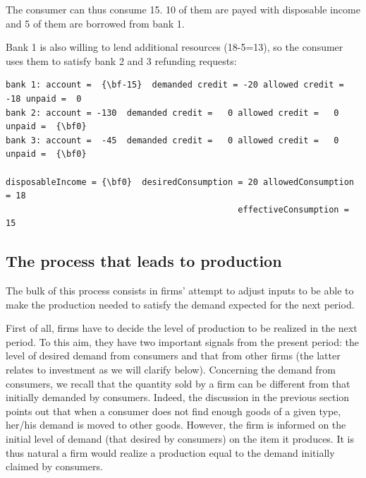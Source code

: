 \documentclass{book}
\begin{document}
The consumer can thus consume 15. 10 of them are payed with disposable income and 5 of them are borrowed from bank 1. 

Bank 1 is also willing to lend additional resources (18-5=13), so the consumer uses them to satisfy bank 2 and 3 refunding requests:

\begin{Verbatim}[commandchars=\\\{\}]
bank 1: account =  {\bf-15}  demanded credit = -20 allowed credit = -18 unpaid =  0
bank 2: account = -130  demanded credit =   0 allowed credit =   0 unpaid =  {\bf0}
bank 3: account =  -45  demanded credit =   0 allowed credit =   0 unpaid =  {\bf0}

disposableIncome = {\bf0}  desiredConsumption = 20 allowedConsumption = 18 
                                              effectiveConsumption = 15
\end{Verbatim}




\subsection{The process that leads to production}

The bulk of this process consists in firms' attempt to adjust inputs to be able to make the production needed to satisfy the demand expected for the next period.

First of all, firms have to decide the level of production to be realized in the next period. To this aim, they have two important signals from the present period: the level of desired demand from consumers and that from other firms (the latter relates to investment as we will clarify below).
Concerning the demand from consumers, we recall that the quantity sold by a firm can be different from that initially demanded by consumers. Indeed, the discussion in the previous section points out that when a consumer does not find enough goods of a given type, her/his demand is moved
to other goods.
However, the firm is informed on the initial level of demand (that desired by consumers) on the item it produces. It is thus natural a firm would realize a production equal to the demand initially claimed by consumers.  

\end{document}
